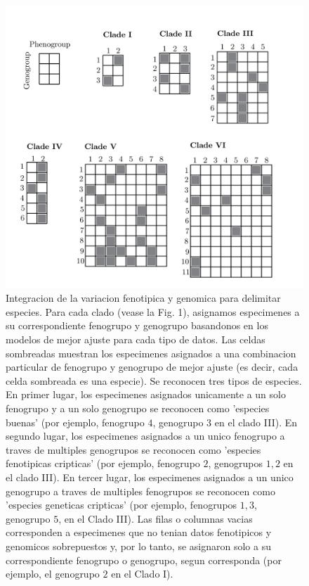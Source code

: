 \documentclass[
  11pt,
]{article}
\begin{document}
\begin{figure}

{\centering \includegraphics[width=0.8\linewidth,]{figures/Figure2} 

}

\caption{Integracion de la variacion fenotipica y genomica para delimitar especies. Para cada clado (vease la Fig. 1), asignamos especimenes a su correspondiente fenogrupo y genogrupo basandonos en los modelos de mejor ajuste para cada tipo de datos. Las celdas sombreadas muestran los especimenes asignados a una combinacion particular de fenogrupo y genogrupo de mejor ajuste (es decir, cada celda sombreada es una especie). Se reconocen tres tipos de especies. En primer lugar, los especimenes asignados unicamente a un solo fenogrupo y a un solo genogrupo se reconocen como 'especies buenas' (por ejemplo, fenogrupo $4$, genogrupo $3$ en el clado III). En segundo lugar, los especimenes asignados a un unico fenogrupo a traves de multiples genogrupos se reconocen como 'especies fenotipicas cripticas' (por ejemplo, fenogrupo $2$, genogrupos $1,2$ en el clado III). En tercer lugar, los especimenes asignados a un unico genogrupo a traves de multiples fenogrupos se reconocen como 'especies geneticas cripticas' (por ejemplo, fenogrupos $1,3$, genogrupo $5$, en el Clado III). Las filas o columnas vacias corresponden a especimenes que no tenian datos fenotipicos y genomicos sobrepuestos y, por lo tanto, se asignaron solo a su correspondiente fenogrupo o genogrupo, segun corresponda (por ejemplo, el genogrupo $2$ en el Clado I).}\label{fig:figure2}
\end{figure}
\end{document}
